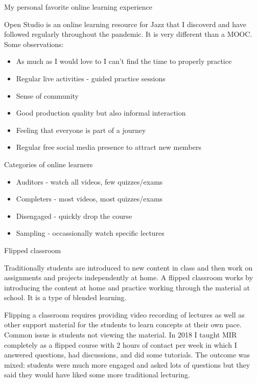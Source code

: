 \documentclass[12pt]{beamer}
\begin{document}
\begin{frame}{My personal favorite online learning experience}

  Open Studio is an online learning resource for Jazz that I discoverd
  and have followed regularly throughout the pandemic. It is very different
  than a MOOC. Some observations:

  \begin{itemize}
  \item{As much as I would love to I can't find the time to properly practice}
  \item{Regular live activities - guided practice sessions}
  \item{Sense of community}
  \item{Good production quality but also informal interaction}
  \item{Feeling that everyone is part of a journey}
  \item{Regular free social media presence to attract new members} 
  \end{itemize} 
\end{frame} 

\begin{frame}{Categories of online learners}
   \begin{itemize}
   \item{Auditors - watch all videos, few quizzes/exams}
   \item{Completers - most videos, most quizzes/exams}
   \item{Disengaged - quickly drop the course}
   \item{Sampling - occassionally watch specific lectures}
  \end{itemize} 
\end{frame} 


\begin{frame}{Flipped classroom}

  Traditionally students are introduced to new content in class and
  then work on assignments and projects independently at home. A flipped
  classroom works by introducing the content at home and practice working
  through the material at school. It is a type of blended learning.

  Flipping a classroom requires providing video recording of lectures
  as well as other support material for the students to learn concepts
  at their own pace. Common issue is students not viewing the material.
  In 2018 I taught MIR completely as a flipped course with 2 hours
  of contact per week in which I answered questions, had discussions,
  and did some tutorials. The outcome was mixed: students were much more
  engaged and asked lots of questions but they said they would have
  liked some more traditional lecturing. 
\end{frame} 
\end{document}
